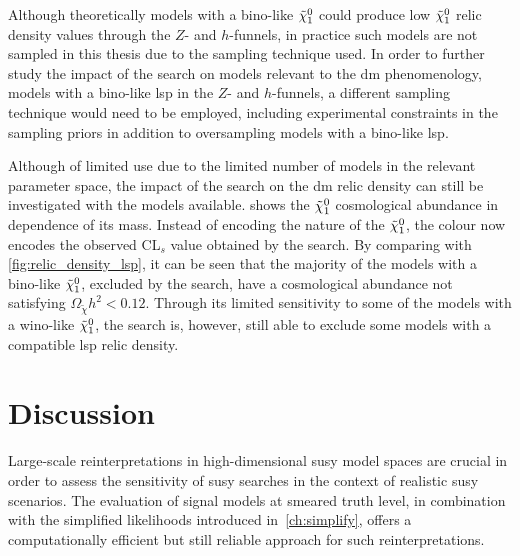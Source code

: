 Although theoretically models with a bino-like $\tilde{\chi}_1^0$ could produce low $\tilde{\chi}_1^0$ relic density values through the $Z$- and $h$-funnels, in practice such models are not sampled in this thesis due to the sampling technique used.
In order to further study the impact of the \onelepton search on models relevant to the \gls{dm} phenomenology, \ie models with a bino-like \gls{lsp} in the $Z$- and $h$-funnels, a different sampling technique would need to be employed, including experimental constraints in the sampling priors in addition to oversampling models with a bino-like \gls{lsp}.

Although of limited use due to the limited number of models in the relevant parameter space, the impact of the \onelepton search on the \gls{dm} relic density can still be investigated with the models available.  shows the $\tilde{\chi}_1^0$ cosmological abundance in dependence of its mass. Instead of encoding the nature of the $\tilde{\chi}_1^0$, the colour now encodes the observed CL$_s$ value obtained by the \onelepton search. By comparing with \cref{fig:relic_density_lsp}, it can be seen that the majority of the models with a bino-like $\tilde{\chi}_1^0$, excluded by the \onelepton search, have a cosmological abundance not satisfying $\Omega_{\tilde{\chi}} h^2 < 0.12$. Through its limited sensitivity to some of the models with a wino-like $\tilde{\chi}_1^0$, the \onelepton search is, however, still able to exclude some models with a compatible \gls{lsp} relic density. 

\section{Discussion}

Large-scale reinterpretations in high-dimensional \gls{susy} model spaces are crucial in order to assess the sensitivity of \gls{susy} searches in the context of realistic \gls{susy} scenarios. The evaluation of signal models at smeared truth level, in combination with the simplified likelihoods introduced in~\cref{ch:simplify}, offers a computationally efficient but still reliable approach for such reinterpretations.

